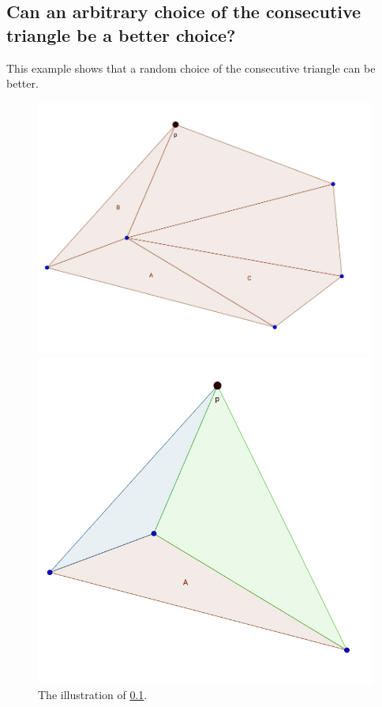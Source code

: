 \documentclass[10pt]{article}
\begin{document}
\subsection{Can an arbitrary choice of the consecutive triangle be a better choice?}\label{Question}
	This example shows that a random choice of the consecutive triangle can be better. 
	\begin{figure}[h]\label{Example}
			\begin{minipage}{0.3\textwidth}
				\includegraphics[scale=0.2]{../Figures/Example.jpg}
			\end{minipage}
			\hfill
			\begin{minipage}{0.4\textwidth}
				\includegraphics[scale=0.2]{../Figures/Calculation.jpg}
			\end{minipage}
		\caption{The illustration of \ref{Question}.}
			
			
	\end{figure}
\end{document}
